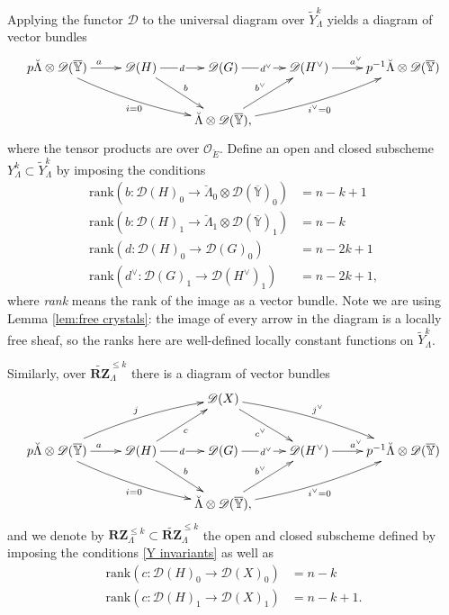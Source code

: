 \documentclass[11pt]{alggeom}
\newcommand{\co}{\mathcal O}
\begin{document}
Applying the functor $\mathscr{D}$  to the universal diagram over $\widetilde{Y}^k_\Lambda$  yields a diagram of vector bundles
\[
\xymatrix{
{p  \breve{\Lambda}  \otimes \mathscr{D}(\overline{\mathbb{Y}})   }\ar[r]^a    \ar@/_/[drr]_{i =0 }  &  {\mathscr{D}(H)} \ar[dr]^b  \ar[r]|{\, d\, }   &  
{\mathscr{D}(G) } \ar[r]|{\, d^\vee \, }  & {\mathscr{ D }(H^\vee)  }  \ar[r]^{a^\vee}  & {p^{-1}   \breve{\Lambda}    \otimes \mathscr{D}(\overline{\mathbb{Y}})     } \\
& &  {   \breve{\Lambda}   \otimes \mathscr{D}(\overline{\mathbb{Y}})    } \ar[ur]^{b^\vee} \ar@/_/[urr]_{i^\vee=0},
}
\]
where the tensor products are over $\co_{\breve{E}}$.  Define an open and closed subscheme  $Y^k_\Lambda \subset \widetilde{Y}^k_\Lambda$  by imposing the conditions
\begin{align}
\mathrm{rank}(  b  : \mathscr{D}(H)_{0} \to 
  \breve{\Lambda}_0   \otimes \mathscr{D}(\overline{\mathbb{Y}})_0   )  & =  n-k+1   \label{Y invariants} \\
\mathrm{rank}(  b  : \mathscr{D}(H)_{1} \to  \breve{\Lambda}_1   \otimes \mathscr{D}(\overline{\mathbb{Y}}) _1 )   & =  n-k  \nonumber \\
\mathrm{rank}(  d  : \mathscr{D}(H)_{0} \to  \mathscr{D}(G)_{0}  )  & = n-2k+1  \nonumber \\
\mathrm{rank}( d^\vee  : \mathscr{D}(G)_{1} \to \mathscr{D}(H^\vee)_{1}  ) & = n-2k+1  \nonumber ,
\end{align}
where \emph{rank} means the rank of the image as a vector bundle.  
Note we are using Lemma \ref{lem:free crystals}: the image of every arrow in the diagram is   a locally free sheaf, so the ranks here are  well-defined  locally constant functions on $\widetilde{Y}^k_\Lambda$.




Similarly, over $\widetilde{\mathbf{RZ}}^{\le k}_\Lambda$ there is a diagram of vector bundles
\[
\xymatrix{
& &   {  \mathscr{D}(X) } \ar[dr]_{c^\vee}  \ar@/^/[drr]^{j^\vee} \\
{p  \breve{\Lambda}  \otimes \mathscr{D}(\overline{\mathbb{Y}})   }\ar[r]^a  \ar@/^/[urr]^{j}   \ar@/_/[drr]_{i =0 }  &  {\mathscr{D}(H)} \ar[ur]_c \ar[dr]^b  \ar[r]|{\, d\, }   &  
{\mathscr{D}(G) } \ar[r]|{\, d^\vee \, }  & {\mathscr{ D }(H^\vee)  }  \ar[r]^{a^\vee}  & {p^{-1}   \breve{\Lambda}    \otimes \mathscr{D}(\overline{\mathbb{Y}})     } \\
& &  {   \breve{\Lambda}   \otimes \mathscr{D}(\overline{\mathbb{Y}})    } \ar[ur]^{b^\vee} \ar@/_/[urr]_{i^\vee=0},
}
\]
and we denote by $\mathbf{RZ}^{\le k}_\Lambda \subset \widetilde{\mathbf{RZ}}^{\le k}_\Lambda$  the open and closed subscheme defined by imposing the conditions  \eqref{Y invariants} as well as
\begin{align}
\mathrm{rank}(c  : \mathscr{D}(H)_{0} \to  \mathscr{D}(X)_{0}  )  & = n-k  \label{RZ invariants} \\
\mathrm{rank}(  c  : \mathscr{D}(H)_{1} \to \mathscr{D}(X)_{1}  ) & = n-k+1  \nonumber .
\end{align}
\end{document}
